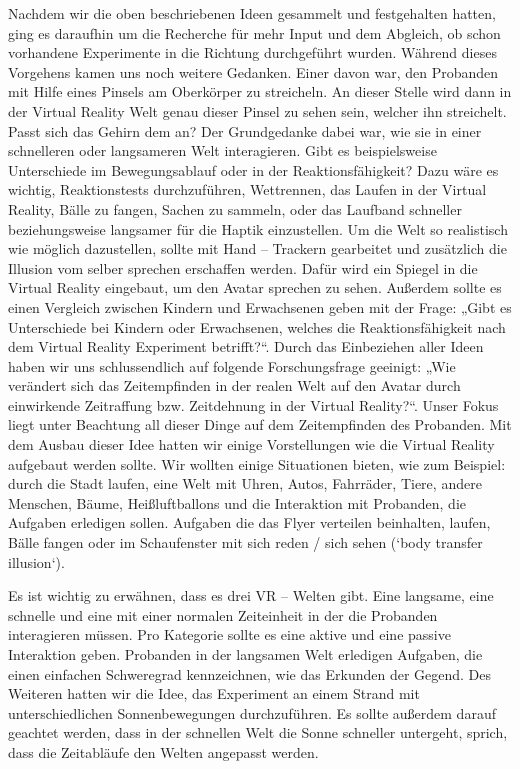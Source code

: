 \documentclass{Bericht}
\begin{document}
\par
Nachdem wir die oben beschriebenen Ideen gesammelt und festgehalten hatten, ging es daraufhin um die Recherche für mehr Input und dem Abgleich, ob schon vorhandene Experimente in die Richtung durchgeführt wurden. Während dieses Vorgehens kamen uns noch weitere Gedanken. Einer davon war, den Probanden mit Hilfe eines Pinsels am Oberkörper zu streicheln. An dieser Stelle wird dann in der Virtual Reality Welt genau dieser Pinsel zu sehen sein, welcher ihn streichelt. Passt sich das Gehirn dem an? Der Grundgedanke dabei war, wie sie in einer schnelleren oder langsameren Welt interagieren. Gibt es beispielsweise Unterschiede im Bewegungsablauf oder in der Reaktionsfähigkeit? Dazu wäre es wichtig, Reaktionstests durchzuführen, Wettrennen, das Laufen in der Virtual Reality, Bälle zu fangen, Sachen zu sammeln, oder das Laufband schneller beziehungsweise langsamer für die Haptik einzustellen. Um die Welt so realistisch wie möglich dazustellen, sollte mit Hand – Trackern gearbeitet und zusätzlich die Illusion vom selber sprechen erschaffen werden. Dafür wird ein Spiegel in die Virtual Reality eingebaut, um den Avatar sprechen zu sehen. Außerdem sollte es einen Vergleich zwischen Kindern und Erwachsenen geben mit der Frage: „Gibt es Unterschiede bei Kindern oder Erwachsenen, welches die Reaktionsfähigkeit nach dem Virtual Reality Experiment betrifft?“. Durch das Einbeziehen aller Ideen haben wir uns schlussendlich auf folgende Forschungsfrage geeinigt: „Wie verändert sich das Zeitempfinden in der realen Welt auf den Avatar durch einwirkende Zeitraffung bzw. Zeitdehnung in der Virtual Reality?“. Unser Fokus liegt unter Beachtung all dieser Dinge auf dem Zeitempfinden des Probanden. Mit dem Ausbau dieser Idee hatten wir einige Vorstellungen wie die Virtual Reality aufgebaut werden sollte. Wir wollten einige Situationen bieten, wie zum Beispiel: durch die Stadt laufen, eine Welt mit Uhren, Autos, Fahrräder, Tiere, andere Menschen, Bäume, Heißluftballons und die Interaktion mit Probanden, die Aufgaben erledigen sollen. Aufgaben die das Flyer verteilen beinhalten, laufen, Bälle fangen oder im Schaufenster mit sich reden / sich sehen (‘body transfer illusion‘).
\par
Es ist wichtig zu erwähnen, dass es drei VR – Welten gibt. Eine langsame, eine schnelle und eine mit einer normalen Zeiteinheit in der die Probanden interagieren müssen. Pro Kategorie sollte es eine aktive und eine passive Interaktion geben. Probanden in der langsamen Welt erledigen Aufgaben, die einen einfachen Schweregrad kennzeichnen, wie das Erkunden der Gegend. Des Weiteren hatten wir die Idee, das Experiment an einem Strand mit unterschiedlichen Sonnenbewegungen durchzuführen. Es sollte außerdem darauf geachtet werden, dass in der schnellen Welt die Sonne schneller untergeht, sprich, dass die Zeitabläufe den Welten angepasst werden.
\end{document}
